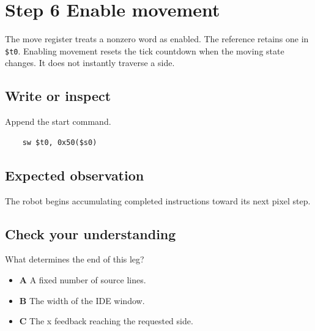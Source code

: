 \section{Step 6 Enable
  movement}\label{006-marsbot-square-s06-step-6-enable-movement}

The move register treats a nonzero word as enabled. The reference
retains one in \texttt{\$t0}. Enabling movement resets the tick
countdown when the moving state changes. It does not instantly traverse
a side.

\subsection{Write or
  inspect}\label{006-marsbot-square-s06-write-or-inspect}

Append the start command.

\begin{verbatim}
    sw $t0, 0x50($s0)
\end{verbatim}

\subsection{Expected
  observation}\label{006-marsbot-square-s06-expected-observation}

The robot begins accumulating completed instructions toward its next
pixel step.

\subsection{Check your
  understanding}\label{006-marsbot-square-s06-check-your-understanding}

What determines the end of this leg?

\begin{itemize}
  \tightlist
  \item
        \textbf{A} A fixed number of source lines.
  \item
        \textbf{B} The width of the IDE window.
  \item
        \textbf{C} The x feedback reaching the requested side.
\end{itemize}
